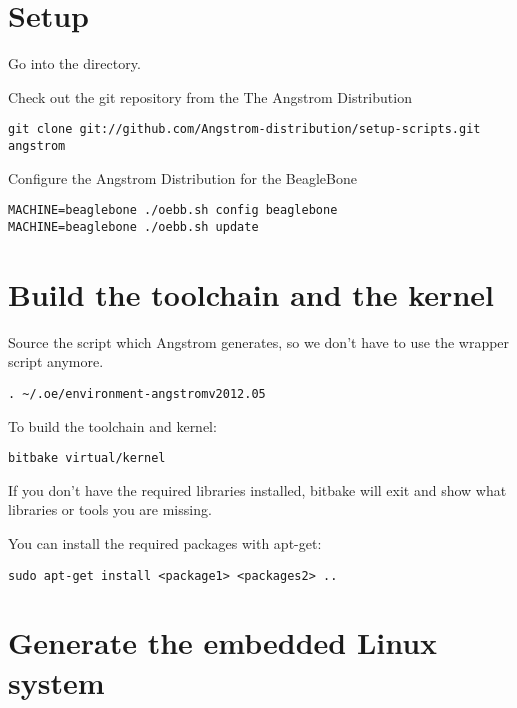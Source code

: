 
\section{Setup}

Go into the  directory.

Check out the git repository from the The Angstrom Distribution

\begin{verbatim}
git clone git://github.com/Angstrom-distribution/setup-scripts.git angstrom
\end{verbatim}

Configure the Angstrom Distribution for the BeagleBone

\begin{verbatim}
MACHINE=beaglebone ./oebb.sh config beaglebone
MACHINE=beaglebone ./oebb.sh update
\end{verbatim}

\section{Build the toolchain and the kernel}

Source the script which Angstrom generates,
so we don't have to use the wrapper script  anymore.

\begin{verbatim}
. ~/.oe/environment-angstromv2012.05
\end{verbatim}

To build the toolchain and kernel:
\begin{verbatim}
bitbake virtual/kernel
\end{verbatim}

If you don't have the required libraries installed,
bitbake will exit and show what libraries or tools you are missing.

You can install the required packages with apt-get:

\begin{verbatim}
sudo apt-get install <package1> <packages2> ..
\end{verbatim}

\section{Generate the embedded Linux system}


